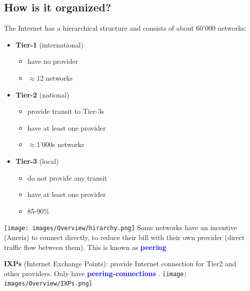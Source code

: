 \documentclass[a4paper, fontsize=8pt, landscape, DIV=1]{scrartcl}
\begin{document}
\begin{multicols*}{4}
		\subsection{How is it organized?}
		The Internet has a hierarchical structure and consists of about 60'000
		networks: 
		\begin{itemize}[noitemsep]
			\item \textbf{Tier-1} (international)
			\begin{itemize}
				\item have no provider 
				\item $\approx$12 networks
			\end{itemize}
			\item \textbf{Tier-2} (national)
			\begin{itemize}
				\item provide transit to Tier-3s
				\item have at least one provider 
				\item $\approx$1'000s networks 	
			\end{itemize}
			\item \textbf{Tier-3} (local)
			\begin{itemize}
				\item do not provide any transit
				\item have at least one provider
				\item 85-90\% 
			\end{itemize}
		\end{itemize}
		\texttt{[image: images/Overview/hirarchy.png]}
		Some networks have an incentive (Anreiz) to connect directly, to reduce
		their bill with their own provider (direct traffic flow between them). This is
		known as \textcolor{Blue}{\textbf{peering}}\par
		
		\textbf{IXPs} (Internet Exchange Points): provide Internet connection for
		Tier2 and other providers. Only have
		\textcolor{Blue}{\textbf{peering-connections}} . 
		\texttt{[image: images/Overview/IXPs.png]}

\end{multicols*}
\end{document}
